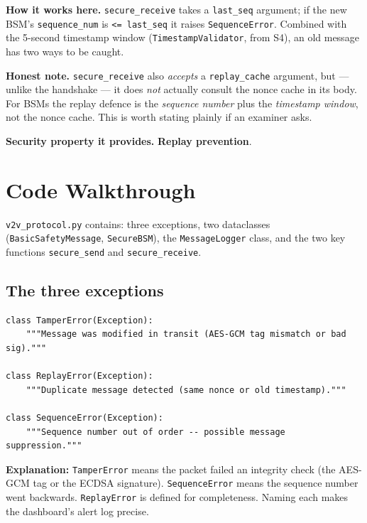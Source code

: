\documentclass[11pt,a4paper]{article}
\begin{document}
\textbf{How it works here.} \texttt{secure\_receive} takes a \texttt{last\_seq}
argument; if the new BSM's \texttt{sequence\_num} is \texttt{<= last\_seq} it
raises \texttt{SequenceError}. Combined with the 5-second timestamp window
(\texttt{TimestampValidator}, from S4), an old message has two ways to be caught.

\textbf{Honest note.} \texttt{secure\_receive} also \emph{accepts} a
\texttt{replay\_cache} argument, but --- unlike the handshake --- it does
\emph{not} actually consult the nonce cache in its body. For BSMs the replay
defence is the \emph{sequence number} plus the \emph{timestamp window}, not the
nonce cache. This is worth stating plainly if an examiner asks.

\textbf{Security property it provides.} \textbf{Replay prevention}.

\section{Code Walkthrough}

\texttt{v2v\_protocol.py} contains: three exceptions, two dataclasses
(\texttt{BasicSafetyMessage}, \texttt{SecureBSM}), the \texttt{MessageLogger}
class, and the two key functions \texttt{secure\_send} and
\texttt{secure\_receive}.

\subsection{The three exceptions}
\begin{lstlisting}[style=py,caption={v2v\_protocol.py --- the messaging exceptions.}]
class TamperError(Exception):
    """Message was modified in transit (AES-GCM tag mismatch or bad sig)."""

class ReplayError(Exception):
    """Duplicate message detected (same nonce or old timestamp)."""

class SequenceError(Exception):
    """Sequence number out of order -- possible message suppression."""
\end{lstlisting}
\textbf{Explanation:} \texttt{TamperError} means the packet failed an integrity
check (the AES-GCM tag or the ECDSA signature). \texttt{SequenceError} means the
sequence number went backwards. \texttt{ReplayError} is defined for completeness.
Naming each makes the dashboard's alert log precise.
\end{document}
